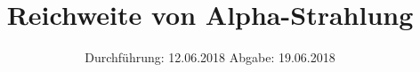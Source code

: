 
\setlength{\parindent}{0 pt}

\subject{V701}
\title{Reichweite von Alpha-Strahlung}
\date{%
  Durchführung: 12.06.2018
  \hspace{3em}
  Abgabe: 19.06.2018
}



\maketitle
\thispagestyle{empty}
\tableofcontents
\newpage






\printbibliography{}



